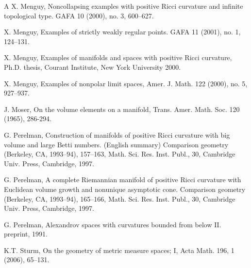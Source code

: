 \documentclass[11pt]{article}
\begin{document}
\begin{thebibliography}{A}
X. Menguy,
Noncollapsing examples with positive Ricci curvature and infinite
topological type.
GAFA 10 (2000), no. 3, 600--627.

X. Menguy,
Examples of strictly weakly regular points.
GAFA
11 (2001), no. 1, 124--131.

X. Menguy,
Examples of manifolds and spaces with positive Ricci curvature,
Ph.D. thesis, Courant Institute, New York University 2000.

X. Menguy,
Examples of nonpolar limit spaces,
Amer. J. Math. 122 (2000), no. 5, 927--937.

J. Moser,
On the volume elements on a manifold, 
Trans. Amer. Math. Soc. 120 (1965), 286-294.

G. Perelman,
Construction of manifolds of positive Ricci curvature with big volume and
large Betti numbers. (English summary) Comparison geometry (Berkeley, CA,
1993--94), 157--163,
Math. Sci. Res. Inst. Publ., 30, Cambridge Univ. Press, Cambridge, 1997.

G. Perelman,
A complete Riemannian manifold of positive
Ricci curvature with Euclidean volume growth and nonunique asymptotic
cone.  Comparison geometry (Berkeley, CA, 1993--94),  165--166, Math.
Sci. Res. Inst. Publ., 30, Cambridge Univ. Press, Cambridge, 1997.

G. Perelman, 
Alexandrov spaces with curvatures bounded from below II. 
preprint, 1991.

K.T. Sturm,
On the geometry of metric measure spaces; I,  
Acta Math. 196, 1 (2006), 65--131.

\end{thebibliography}
\end{document}
